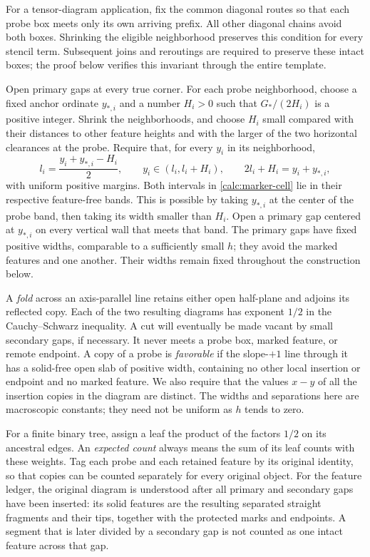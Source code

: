 For a tensor-diagram application, fix the common diagonal routes so
that each probe box meets only its own arriving prefix. All other
diagonal chains avoid both boxes. Shrinking the eligible neighborhood
preserves this condition for every stencil term. Subsequent joins and
reroutings are required to preserve these intact boxes; the proof
below verifies this invariant through the entire template.

Open primary gaps at every true corner. For each probe neighborhood,
choose a fixed anchor ordinate $y_{*,i}$ and a number $H_i>0$ such that
$G_*/(2H_i)$ is a positive integer. Shrink the neighborhoods, and
choose $H_i$ small compared with their distances to other feature
heights and with the larger of the two horizontal clearances at the
probe. Require that, for every $y_i$ in its neighborhood,
\begin{equation}
 l_i=\frac{y_i+y_{*,i}-H_i}{2},\qquad
 y_i\in(l_i,l_i+H_i),
 \qquad 2l_i+H_i=y_i+y_{*,i},
 \label{calc:marker-cell}
\end{equation}
with uniform positive margins. Both intervals in
\eqref{calc:marker-cell} lie in their respective feature-free bands.
This is possible by taking $y_{*,i}$ at the center of the probe band,
then taking its width smaller than $H_i$. Open a primary gap centered
at $y_{*,i}$ on every vertical wall that meets that band. The primary
gaps have fixed positive widths, comparable to a sufficiently small
$h$; they avoid the marked features and one another. Their widths
remain fixed throughout the construction below.

A \emph{fold} across an axis-parallel line retains either open
half-plane and adjoins its reflected copy. Each of the two resulting
diagrams has exponent $1/2$ in the Cauchy--Schwarz inequality. A cut
will eventually be made vacant by small secondary gaps, if necessary.
It never meets a probe box, marked feature, or remote endpoint. A
copy of a probe is \emph{favorable} if the slope-$+1$ line through it
has a solid-free open slab of positive width, containing no other
local insertion or endpoint and no marked feature. We also require
that the values $x-y$ of all the insertion copies in the diagram are
distinct. The widths and separations here are macroscopic constants;
they need not be uniform as $h$ tends to zero.

For a finite binary tree, assign a leaf the product of the factors
$1/2$ on its ancestral edges. An \emph{expected count} always means
the sum of its leaf counts with these weights. Tag each probe and
each retained feature by its original identity, so that copies can
be counted separately for every original object.
For the feature ledger, the original diagram is understood after
all primary and secondary gaps have been inserted: its solid
features are the resulting separated straight fragments and their
tips, together with the protected marks and endpoints. A segment
that is later divided by a secondary gap is not counted as one
intact feature across that gap.


